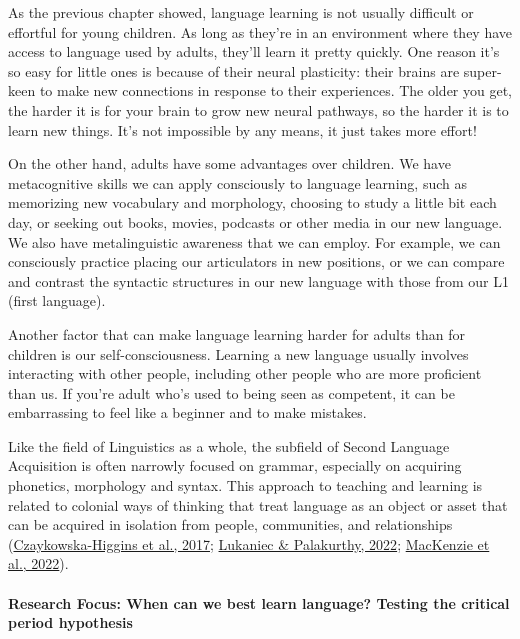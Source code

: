 \documentclass[
]{krantz}
\begin{document}
As the previous chapter showed, language learning is not usually difficult or effortful for young children. As long as they're in an environment where they have access to language used by adults, they'll learn it pretty quickly. One reason it's so easy for little ones is because of their neural plasticity: their brains are super-keen to make new connections in response to their experiences. The older you get, the harder it is for your brain to grow new neural pathways, so the harder it is to learn new things. It's not impossible by any means, it just takes more effort!

On the other hand, adults have some advantages over children. We have metacognitive skills we can apply consciously to language learning, such as memorizing new vocabulary and morphology, choosing to study a little bit each day, or seeking out books, movies, podcasts or other media in our new language. We also have metalinguistic awareness that we can employ. For example, we can consciously practice placing our articulators in new positions, or we can compare and contrast the syntactic structures in our new language with those from our L1 (first language).

Another factor that can make language learning harder for adults than for children is our self-consciousness. Learning a new language usually involves interacting with other people, including other people who are more proficient than us. If you're adult who's used to being seen as competent, it can be embarrassing to feel like a beginner and to make mistakes.

Like the field of Linguistics as a whole, the subfield of Second Language Acquisition is often narrowly focused on grammar, especially on acquiring phonetics, morphology and syntax. This approach to teaching and learning is related to colonial ways of thinking that treat language as an object or asset that can be acquired in isolation from people, communities, and relationships (\protect\hyperlink{ref-czaykowska2017}{Czaykowska-Higgins et al., 2017}; \protect\hyperlink{ref-lukaniec2022}{Lukaniec \& Palakurthy, 2022}; \protect\hyperlink{ref-mackenzie2022}{MacKenzie et al., 2022}).

\hypertarget{research-focus-when-can-we-best-learn-language-testing-the-critical-period-hypothesis}{%
\paragraph*{Research Focus: When can we best learn language? Testing the critical period hypothesis}\label{research-focus-when-can-we-best-learn-language-testing-the-critical-period-hypothesis}}
\end{document}
